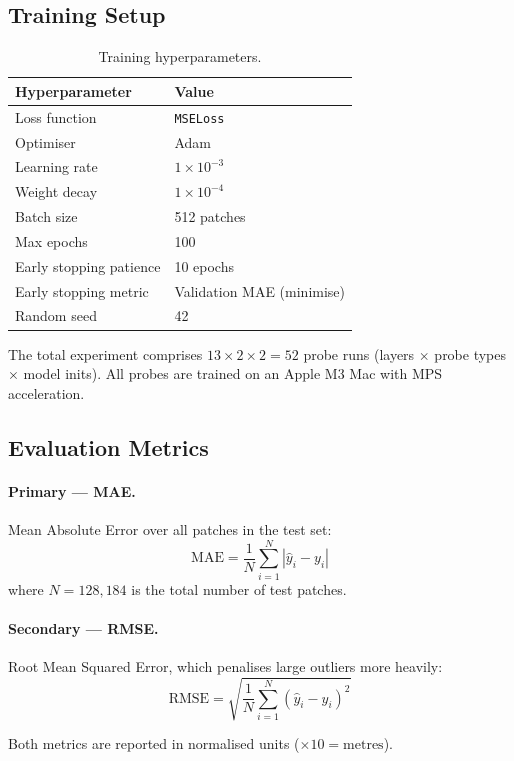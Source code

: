 \documentclass[11pt,a4paper]{article}
\begin{document}
\subsection{Training Setup}

\begin{table}[H]
\centering
\caption{Training hyperparameters.}
\begin{tabular}{ll}
\toprule
Hyperparameter & Value \\
\midrule
Loss function & \texttt{MSELoss} \\
Optimiser & Adam \\
Learning rate & $1\!\times\!10^{-3}$ \\
Weight decay & $1\!\times\!10^{-4}$ \\
Batch size & 512 patches \\
Max epochs & 100 \\
Early stopping patience & 10 epochs \\
Early stopping metric & Validation MAE (minimise) \\
Random seed & 42 \\
\bottomrule
\end{tabular}
\label{tab:hparams}
\end{table}

The total experiment comprises $13 \times 2 \times 2 = 52$ probe runs (layers
$\times$ probe types $\times$ model inits).  All probes are trained on an
Apple M3 Mac with MPS acceleration.

\subsection{Evaluation Metrics}

\paragraph{Primary --- MAE.}  Mean Absolute Error over all patches in the
test set:
\[
    \text{MAE} = \frac{1}{N}\sum_{i=1}^{N}|\hat{y}_i - y_i|
\]
where $N = 128,\!184$ is the total number of test patches.

\paragraph{Secondary --- RMSE.}  Root Mean Squared Error, which penalises
large outliers more heavily:
\[
    \text{RMSE} = \sqrt{\frac{1}{N}\sum_{i=1}^{N}(\hat{y}_i - y_i)^2}
\]

Both metrics are reported in normalised units ($\times 10 = \text{metres}$).
\end{document}
